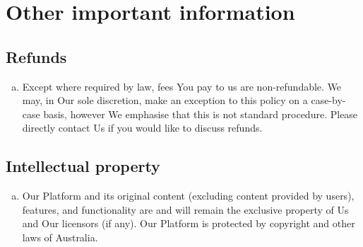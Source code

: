 \documentclass[10pt]{article}
\begin{document}
\section{Other important information}
\subsection{Refunds}
\begin{enumerate}[(a)]
\item
Except where required by law, fees You pay to us are non-refundable. We may, in Our sole discretion, make an exception to this policy on a case-by-case basis, however We emphasise that this is not standard procedure. Please directly contact Us if you would like to discuss refunds.
\end{enumerate}

\subsection{Intellectual property}
\begin{enumerate}[(a)]
\item
Our Platform and its original content (excluding content provided by users), features, and functionality are and will remain the exclusive property of Us and Our licensors (if any). Our Platform is protected by copyright and other laws of Australia.
\end{enumerate}
\end{document}
